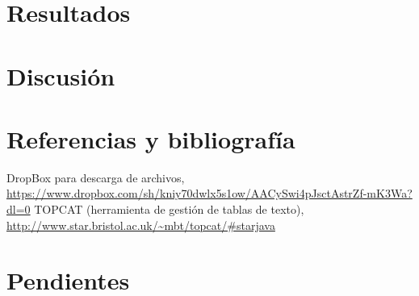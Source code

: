 \documentclass[a4paper,headsepline,footsepline,draft=false]{scrartcl}
\def\borrador{}
\begin{document}
\section{Resultados}

\section{Discusión}

\section{Referencias y bibliografía}
\begin{thebibliography}{50}
		DropBox para descarga de archivos, 
		\url{https://www.dropbox.com/sh/kniy70dwlx5s1ow/AACySwi4pJsctAstrZf-mK3Wa?dl=0}
		TOPCAT (herramienta de gestión de tablas de texto), 
		\url{http://www.star.bristol.ac.uk/~mbt/topcat/#starjava}
\end{thebibliography}

\ifdefined\borrador
\section*{Pendientes}
	\listoftodos
\fi
\end{document}
